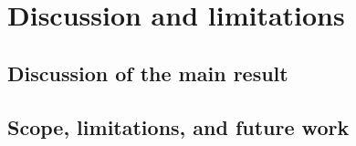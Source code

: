 \section{Discussion and limitations}\label{sec:discussion}


\subsection{Discussion of the main result}\label{subsec:discussion-main-result}


\subsection{Scope, limitations, and future work}\label{subsec:discussion-scope-limitations}

